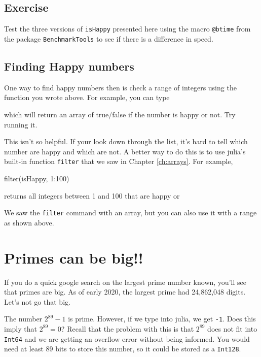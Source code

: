 \subsection{Exercise}

Test the three versions of \verb!isHappy! presented here using the macro \verb!@btime! from the package \verb!BenchmarkTools! to see if there is a difference in speed.  

\subsection{Finding Happy numbers}

One way to find happy numbers then is check a range of integers using
the function you wrote above. For example, you can type

\begin{jlblock}[nt]
[isHappy(n) for n=1:100]
\end{jlblock}
%
which will return an array of true/false if the number is happy or not.  Try running it. 

This isn't so helpful.  If your look down through the list, it's hard to tell which number are happy and which are not.  A better way to do this is to use julia's built-in function \texttt{filter} that we saw in Chapter \ref{ch:arrays}.  For example,

\begin{jlblock}[nt]
filter(isHappy, 1:100)
\end{jlblock}
%
returns all integers between 1 and 100 that are happy or

 \printpythontex[verbatim]

We saw the \texttt{filter} command with an array, but you can also use it with a range as shown above.  

\section{Primes can be big!!}

If you do a quick google search on the largest prime number known,
you'll see that primes are big. As of early 2020, the largest prime had
24,862,048 digits. Let's not go that big.

The number $2^{89}-1$ is prime. However, if we type  into julia,
we get \texttt{-1}.  Does this imply that $2^{89}=0$? Recall that the
problem with this is that $2^{89}$ does not fit into \texttt{Int64}
and we are getting an overflow error without being informed. You would need at least 89 bits to store this number, so it could be stored as a \verb!Int128!. 

